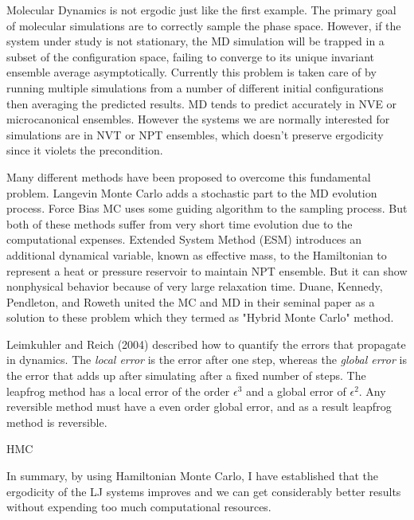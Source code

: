 \documentclass[aps,prl,reprint]{revtex4-1}
\begin{document}
Molecular Dynamics is not ergodic just like the first example. The primary goal of molecular simulations are to correctly sample the phase space. However, if the system under study is not stationary, the MD simulation will be trapped in a subset of the configuration space, failing to converge to its unique invariant ensemble average asymptotically.\cite{Neal2012} Currently this problem is taken care of by running multiple simulations from a number of different initial configurations then averaging the predicted results.\cite{Calvo2002} MD tends to predict accurately in NVE or microcanonical ensembles. However the systems we are normally interested for simulations are in NVT or NPT ensembles, which doesn't preserve ergodicity since it violets the precondition.

Many different methods have been proposed to overcome this fundamental problem. Langevin Monte Carlo adds a stochastic part to the MD evolution process. Force Bias MC uses some guiding algorithm to the sampling process. But both of these methods suffer from very short time evolution due to the computational expenses. Extended System Method (ESM) introduces an additional dynamical variable, known as effective mass, to the Hamiltonian to represent a heat or pressure reservoir to maintain NPT ensemble. But it can show nonphysical behavior because of very large relaxation time.\cite{Cho1992} Duane, Kennedy, Pendleton, and Roweth united the MC and MD in their seminal paper as a solution to these problem which they termed as "Hybrid Monte Carlo" method.\cite{Duane1987}

Leimkuhler and Reich (2004) described how to quantify the errors that propagate in dynamics. The \textit{local error} is the error after one step, whereas the \textit{global error} is the error that adds up after simulating after a fixed number of steps. The leapfrog method has a local error of the order $\epsilon ^ 3$ and a global error of $\epsilon ^ 2$. Any reversible method must have a even order global error, and as a result leapfrog method is reversible.

HMC 

In summary, by using Hamiltonian Monte Carlo, I have established that the ergodicity of the LJ systems improves and we can get considerably better results without expending too much computational resources. 





\end{document}
